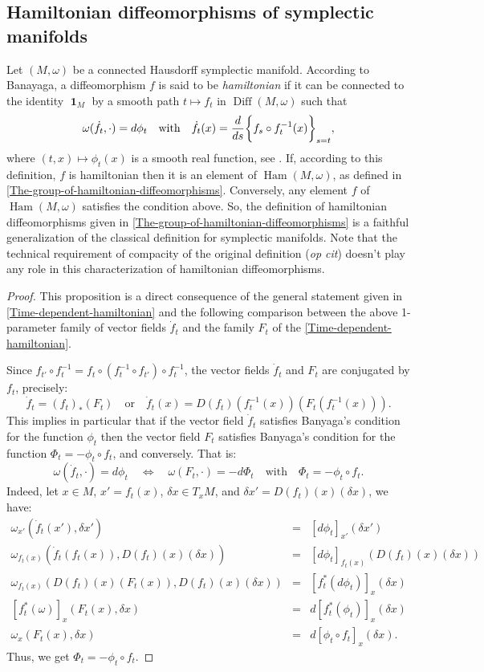 \documentclass[10pt,reqno,twoside]{amsart}
\newcommand{\qmbox}[1]{\quad\mbox{#1}\quad}
\DeclareMathOperator{\id}{\mathbf{1}}
\DeclareMathOperator{\Diff}{Diff}
\DeclareMathOperator{\Ham}{Ham}
\newcommand{\D}{D}
\newcommand{\T}{T}
\theoremstyle{plain}
\theoremstyle{definition}
\newcommand{\article}[1]{\subsection{#1}}
\begin{document}
  \article{Hamiltonian diffeomorphisms of symplectic manifolds}
  \label{Hamiltonian-diffeomorphisms-on-symplectic-manifolds}
  Let $(M,\omega)$ be a con\-nected Hausdorff symplectic manifold.
  According to Banayaga,
  a diffeomorphism $f$ is said to be {\em hamiltonian\/} if it can be connected to the identity $\id_M$ by a smooth path $t \mapsto f_t$ in $\Diff(M, \omega)$ such that
  $$
    \omega(\dot f_t, \cdot) = d\phi_t \qmbox{with} \dot f_t(x) = {d \over ds}\bigg\{f_s \circ f_t^{-1}(x)\bigg\}_{s=t},
    $$
  where $(t,x) \mapsto \phi_t(x)$ is a smooth real function,
  see \cite{Ban78}.
  If,
  according to this definition,
  $f$ is hamiltonian then it is an element of $\Ham(M, \omega)$,
  as defined in \ref{The-group-of-hamiltonian-diffeomorphisms}.
  Conversely,
  any element $f$ of $\Ham(M, \omega)$ satisfies the condition above.
  So,
  the definition of hamiltonian diffeomorphisms given in \ref{The-group-of-hamiltonian-diffeomorphisms} is a faithful generalization of the classical definition for symplectic manifolds.
  Note that the technical requirement of compacity of the original definition ({\em op cit}) doesn't play any role in this characterization of hamiltonian diffeomorphisms.
  
  \begin{proof}
    This proposition is a direct consequence of the general statement given in \ref{Time-dependent-hamiltonian} and the following comparison between the above 1-parameter family of vector fields $\dot f_t$ and the family $F_t$ of the \ref{Time-dependent-hamiltonian}.
    
    Since $f_{t'} \circ f_t^{-1} = f_t \circ (f_t^{-1} \circ f_{t'}) \circ f_t^{-1}$,
    the vector fields $\dot f_t$ and $F_t$ are conjugated by $f_t$,
    precisely:
    $$
      \dot f_t = (f_t)_*(F_t) \qmbox{or} \dot f_t(x) = \D(f_t)(f_t^{-1}(x))(F_t(f_t^{-1}(x))).
      $$
    This implies in particular that if the vector field $\dot f_t$ satisfies Banyaga's condition for the function $\phi_t$ then the vector field $F_t$ satisfies Banyaga's condition for the function $\Phi_t = -\phi_t \circ f_t$,
    and conversely.
    That is:
    $$
      \omega(\dot f_t, \cdot) = d\phi_t \quad \Leftrightarrow \quad \omega(F_t, \cdot) = - d\Phi_t \qmbox{with} \Phi_t = - \phi_t \circ f_t.
      $$
    Indeed,
    let $x \in M$,
    $x' = f_t(x)$,
    $\delta x \in \T_x M$,
    and $\delta x' = \D(f_t)(x)(\delta x)$,
    we have:
    \begin{eqnarray*}
      \omega_{x'} (\dot f_t(x'), \delta x') & =& [d\phi_t]_{x'}(\delta x') \\
      \omega_{f_t(x)}(\dot f_t (f_t(x)), \D(f_t)(x)(\delta x)) & =& [d\phi_t]_{f_t(x)}(\D(f_t)(x)(\delta x)) \\
      \omega_{f_t(x)}(\D(f_t)(x)(F_t(x)), \D(f_t)(x)(\delta x)) & =& [f_t^*(d\phi_t)]_x(\delta x) \\
      {[f_t^*(\omega)]}_x(F_t(x), \delta x) &=& d[f_t^*(\phi_t)]_x(\delta x) \\
      \omega_x(F_t(x),\delta x) & = & d[\phi_t \circ f_t]_x(\delta x).
    \end{eqnarray*}
    Thus,
    we get $\Phi_t = - \phi_t \circ f_t$.
  \end{proof}
  
\end{document}
